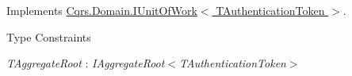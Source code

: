 Implements \hyperlink{interfaceCqrs_1_1Domain_1_1IUnitOfWork_a449dde9a112fcce6aaab0e4c8b3b9a71_a449dde9a112fcce6aaab0e4c8b3b9a71}{Cqrs.\+Domain.\+I\+Unit\+Of\+Work$<$ T\+Authentication\+Token $>$}.

\begin{Desc}
\item[Type Constraints]\begin{description}
\item[{\em T\+Aggregate\+Root} : {\em I\+Aggregate\+Root$<$T\+Authentication\+Token$>$}]\end{description}
\end{Desc}

